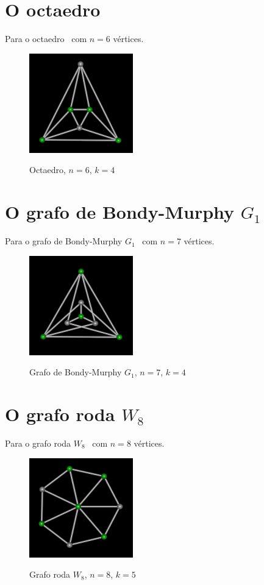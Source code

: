 \section{O octaedro}
Para o octaedro~\cite{cite:example-plato} com $n=6$ vértices.

\begin{figure}[htb]
\centering
\includegraphics[width=0.4\textwidth]{img/octaedro.png}
\label{fig:example-octaedro}
\caption{Octaedro, $n=6$, $k=4$}
\end{figure}


\section{O grafo de Bondy-Murphy $G_1$}
Para o grafo de Bondy-Murphy $G_1$~\cite{cite:example-bondy} com $n=7$
vértices.

\begin{figure}[htb]
\centering
\includegraphics[width=0.4\textwidth]{img/bondymurphyg1.png}
\label{fig:example-bondymurphyg1}
\caption{Grafo de Bondy-Murphy $G_1$, $n=7$, $k=4$}
\end{figure}


\section{O grafo roda $W_8$}
Para o grafo roda $W_8$~\cite{cite:example-bondy} com $n=8$ vértices.

\begin{figure}[htb]
\centering
\includegraphics[width=0.4\textwidth]{img/wheel.png}
\label{fig:example-wheel}
\caption{Grafo roda $W_8$, $n=8$, $k=5$}
\end{figure}


